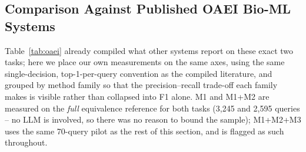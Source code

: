 \documentclass[conference]{IEEEtran}
\begin{document}
\subsection{Comparison Against Published OAEI Bio-ML Systems}
\label{sec:oaeicompare}

Table~\ref{tab:oaei} already compiled what other systems report on these exact two tasks; here we place our own measurements on the same axes, using the same single-decision, top-1-per-query convention as the compiled literature, and grouped by method family so that the precision--recall trade-off each family makes is visible rather than collapsed into F1 alone. M1 and M1+M2 are measured on the \emph{full} equivalence reference for both tasks (3{,}245 and 2{,}595 queries -- no LLM is involved, so there was no reason to bound the sample); M1+M2+M3 uses the same 70-query pilot as the rest of this section, and is flagged as such throughout.
\end{document}
